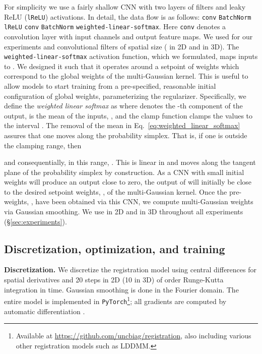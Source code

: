 \documentclass[10pt,twocolumn,letterpaper,table]{article}
\numberwithin{equation}{section}
\theoremstyle{plain}
\theoremstyle{definition}
\begin{document}
For simplicity we use a fairly shallow CNN with two layers of 
filters and leaky ReLU (\texttt{lReLU}) \cite{Maas13a} activations.
In detail, the data flow is as follows: 
\texttt{conv}  \texttt{BatchNorm}  \texttt{lReLU}  \texttt{conv}  \texttt{BatchNorm}  \texttt{weighted-linear-softmax}. Here \texttt{conv} denotes a convolution layer with  input channels and  output feature maps. We used  for our experiments and convolutional filters of spatial size  ( in 2D and  in 3D). The \texttt{weighted-linear-softmax} activation function, which we formulated, maps inputs to . We designed it such that it operates around a setpoint of weights  which correspond to the global weights of the multi-Gaussian kernel. This is useful to allow models to start training from a pre-specified, reasonable initial configuration of global weights, parameterizing the regularizer. Specifically, we define the {\it weighted linear softmax}  as 
where  denotes the -th component of the output,  is the mean of the inputs, , and the clamp function clamps the values to the interval . The removal of the mean in Eq.~\eqref{eq:weighted_linear_softmax} assures that one moves along the probability simplex. That is, if one is outside the clamping range, then 

and consequentially, in this range, . This is linear in  and moves along the tangent plane of the probability simplex by construction. 
As a CNN with small initial weights will produce an output close to zero, the output of  will initially be close to the desired setpoint weights, , of the multi-Gaussian kernel. 
Once the pre-weights, , have been obtained via this CNN, we compute multi-Gaussian weights via Gaussian smoothing. We use  in 2D and  in 3D throughout all experiments (\S\ref{sec:experiments}).

\subsection{Discretization, optimization, and training}
\label{subsec:discretization_optimization_training}

\noindent
{\bf Discretization.} We discretize the registration model using central differences for spatial derivatives and 20 steps in 2D (10 in 3D) of  order Runge-Kutta integration in time. Gaussian smoothing is done in the Fourier domain. The entire model is implemented in \texttt{PyTorch}\footnote{Available at \url{https://github.com/uncbiag/registration}, also including various other registration models such as LDDMM.}; all gradients are computed by automatic differentiation \cite{Paszke17a}.
\end{document}
